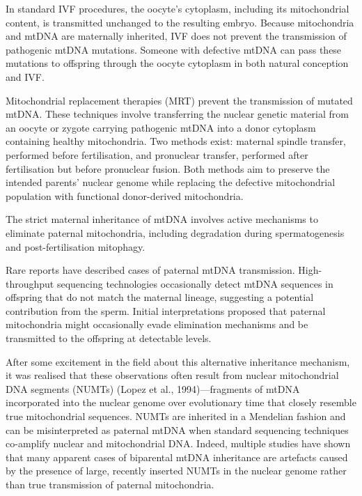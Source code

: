 In standard IVF procedures, the oocyte’s cytoplasm, including its mitochondrial content, is transmitted unchanged to the resulting embryo. Because mitochondria and mtDNA are maternally inherited, IVF does not prevent the transmission of pathogenic mtDNA mutations. Someone with defective mtDNA can pass these mutations to offspring through the oocyte cytoplasm in both natural conception and IVF.

Mitochondrial replacement therapies (MRT) prevent the transmission of mutated mtDNA. These techniques involve transferring the nuclear genetic material from an oocyte or zygote carrying pathogenic mtDNA into a donor cytoplasm containing healthy mitochondria. Two methods exist: maternal spindle transfer, performed before fertilisation, and pronuclear transfer, performed after fertilisation but before pronuclear fusion. Both methods aim to preserve the intended parents' nuclear genome while replacing the defective mitochondrial population with functional donor-derived mitochondria.

The strict maternal inheritance of mtDNA involves active mechanisms to eliminate paternal mitochondria, including degradation during spermatogenesis and post-fertilisation mitophagy.

Rare reports have described cases of paternal mtDNA transmission. High-throughput sequencing technologies occasionally detect mtDNA sequences in offspring that do not match the maternal lineage, suggesting a potential contribution from the sperm. Initial interpretations proposed that paternal mitochondria might occasionally evade elimination mechanisms and be transmitted to the offspring at detectable levels.

After some excitement in the field about this alternative inheritance mechanism, it was realised that these observations often result from nuclear mitochondrial DNA segments (NUMTs) (Lopez et al., 1994)—fragments of mtDNA incorporated into the nuclear genome over evolutionary time that closely resemble true mitochondrial sequences. NUMTs are inherited in a Mendelian fashion and can be misinterpreted as paternal mtDNA when standard sequencing techniques co-amplify nuclear and mitochondrial DNA. Indeed, multiple studies have shown that many apparent cases of biparental mtDNA inheritance are artefacts caused by the presence of large, recently inserted NUMTs in the nuclear genome rather than true transmission of paternal mitochondria.


